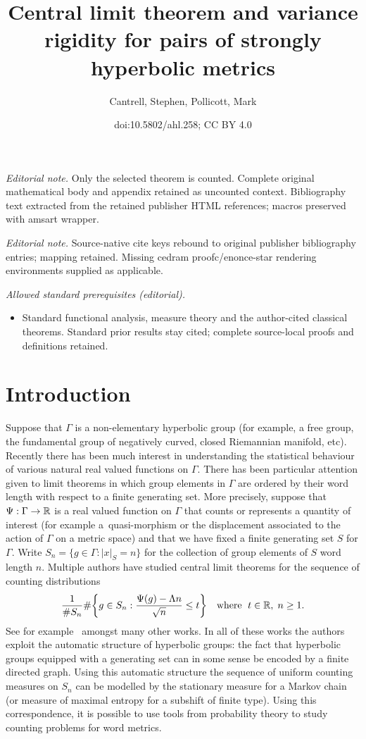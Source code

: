 \documentclass[10pt]{amsart}
\title{Central limit theorem and variance rigidity for pairs of strongly hyperbolic metrics}
\author{Cantrell, Stephen, Pollicott, Mark}
\date{doi:10.5802/ahl.258; CC BY 4.0}
\theoremstyle{definition}\newtheorem{defi}[theo]{Definition}\newtheorem{rema}[theo]{Remark}\newtheorem{exam}[theo]{Example}\newtheorem{exem}[theo]{Example}\newtheorem{nota}[theo]{Notation}
\newcommand{\G}{\Gamma}
\newcommand{\R}{\mathbb{R}}
\let\originalleft\left
\let\originalright\right
\renewcommand{\left}{\mathopen{}\mathclose\bgroup\originalleft}
\renewcommand{\right}{\aftergroup\egroup\originalright}
\renewcommand*{\to}{\mathchoice{\longrightarrow}{\rightarrow}{\rightarrow}{\rightarrow}}
\theoremstyle{plain}
\begin{document}
\maketitle
\noindent\textit{Editorial note.} Only the selected theorem is counted. Complete original mathematical body and appendix retained as uncounted context. Bibliography text extracted from the retained publisher HTML references; macros preserved with amsart wrapper.\par\medskip
\noindent\textit{Editorial note.} Source-native cite keys rebound to original publisher bibliography entries; mapping retained. Missing cedram proofc/enonce-star rendering environments supplied as applicable.\par\medskip
\noindent\textit{Allowed standard prerequisites (editorial).}\begin{itemize}
\item Standard functional analysis, measure theory and the author-cited classical theorems. Standard prior results stay cited; complete source-local proofs and definitions retained.
\end{itemize}\medskip

\section*{Introduction}
Suppose that $\Gamma$ is a non-elementary hyperbolic group (for example, a free group, the fundamental group of negatively curved, closed Riemannian manifold, etc). Recently there has been much interest in understanding the statistical behaviour of various natural real valued functions on $\G$. There has been particular attention given to limit theorems in which group elements in $\G$ are ordered by their word length with respect to a finite generating set. More precisely, suppose that $\Psi: \G \to \R$ is a real valued function on $\G$ that counts or represents a quantity of interest (for example a~quasi-morphism or the displacement associated to the action of $\G$ on a metric space) and that we have fixed a finite generating set $S$ for $\Gamma$. Write $S_n = \{ g\in\Gamma: |x|_S = n \}$ for the collection of group elements of $S$ word length $n$. Multiple authors have studied central limit theorems for the sequence of counting distributions
\[
\frac{1}{\#S_n} \#\left\{ g \in S_n : \frac{\Psi(g)- \Lambda n}{\sqrt{n}} \le t \right\} \quad \text{where }\; t\in \R,\; n\ge 1.
\]
See for example~\cite{cantrell,CalegariFujiwara2010,chas.lalley,calegari.maher,cantrell.sert,calegari.walker,GTT2,GTT,horsham.sharp,rivin} amongst many other works. In all of these works the authors exploit the automatic structure of hyperbolic groups: the fact that hyperbolic groups equipped with a generating set can in some sense be encoded by a finite directed graph. Using this automatic structure the sequence of uniform counting measures on $S_n$ can be modelled by the stationary measure for a Markov chain (or measure of maximal entropy for a subshift of finite type). Using this correspondence, it is possible to use tools from probability theory to study counting problems for word metrics.
\end{document}
